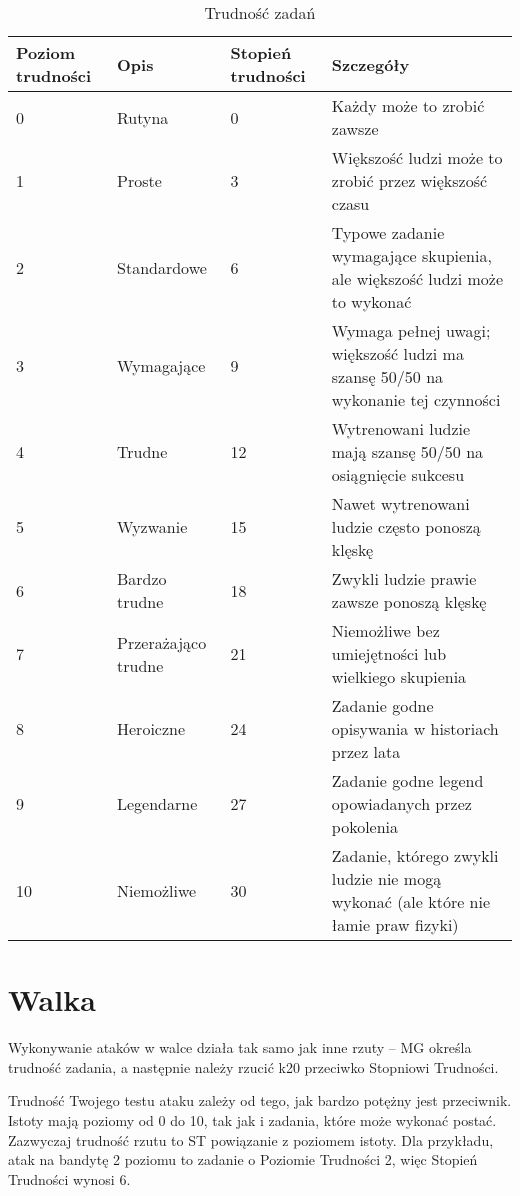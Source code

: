 \begin{table*}[t]
 \centering
 \begin{tabularx}{\textwidth}{ | X | X | X | p{} |}
  \hline
  \textbf{ Poziom trudności} & \textbf{Opis} & \textbf{Stopień trudności} & \textbf{Szczegóły}  \\ \hline
    0 & Rutyna & 0 & Każdy może to zrobić zawsze \\ \hline
    1 & Proste & 3 & Większość ludzi może to zrobić przez większość czasu  \\ \hline
    2 & Standardowe & 6 & Typowe zadanie wymagające skupienia, ale większość ludzi może to wykonać \\ \hline
    3 & Wymagające & 9 & Wymaga pełnej uwagi; większość ludzi ma szansę 50/50 na wykonanie tej czynności \\ \hline
    4 & Trudne & 12 & Wytrenowani ludzie mają szansę 50/50 na osiągnięcie sukcesu \\ \hline
    5 & Wyzwanie & 15 &Nawet wytrenowani ludzie często ponoszą klęskę \\ \hline
    6 & Bardzo trudne &18 &Zwykli ludzie prawie zawsze ponoszą klęskę \\ \hline
    7 & Przerażająco trudne & 21 &Niemożliwe bez umiejętności lub wielkiego skupienia \\ \hline
    8 & Heroiczne & 24 &Zadanie godne opisywania w historiach przez lata \\ \hline
    9 & Legendarne &27 &Zadanie godne legend opowiadanych przez pokolenia \\ \hline
    10 & Niemożliwe & 30 & Zadanie, którego zwykli ludzie nie mogą wykonać (ale które nie łamie praw fizyki) \\ \hline
 \end{tabularx}
  \caption {Trudność zadań}
  \label {Trudność zadań}
 \end{table*}
 
\section {Walka}
Wykonywanie ataków w walce działa tak samo jak inne rzuty – MG określa trudność zadania, a następnie należy rzucić k20 przeciwko Stopniowi Trudności.

Trudność Twojego testu ataku zależy od tego, jak bardzo potężny jest przeciwnik. Istoty mają poziomy od 0 do 10, tak jak i zadania, które może wykonać postać. Zazwyczaj trudność rzutu to ST powiązanie z poziomem istoty. Dla przykładu, atak na bandytę 2 poziomu to zadanie o Poziomie Trudności 2, więc Stopień Trudności wynosi 6. 


